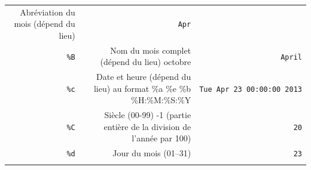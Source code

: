 \documentclass[12pt,]{book}
\numberwithin{equation}{section}
\numberwithin{countremarque}{section}
\begin{document}
\begin{longtable}[]{@{}rrr@{}}
\begin{minipage}[t]{0.60\columnwidth}
Abréviation du mois (dépend du lieu)\strut
\end{minipage} & \begin{minipage}[t]{0.22\columnwidth}\raggedleft\strut
\texttt{Apr}\strut
\end{minipage}\tabularnewline
\begin{minipage}[t]{0.10\columnwidth}\raggedleft\strut
\texttt{\%B}\strut
\end{minipage} & \begin{minipage}[t]{0.60\columnwidth}\raggedleft\strut
Nom du mois complet (dépend du lieu) octobre\strut
\end{minipage} & \begin{minipage}[t]{0.22\columnwidth}\raggedleft\strut
\texttt{April}\strut
\end{minipage}\tabularnewline
\begin{minipage}[t]{0.10\columnwidth}\raggedleft\strut
\texttt{\%c}\strut
\end{minipage} & \begin{minipage}[t]{0.60\columnwidth}\raggedleft\strut
Date et heure (dépend du lieu) au format \%a \%e \%b
\%H:\%M:\%S:\%Y\strut
\end{minipage} & \begin{minipage}[t]{0.22\columnwidth}\raggedleft\strut
\texttt{Tue\ Apr\ 23\ 00:00:00\ 2013}\strut
\end{minipage}\tabularnewline
\begin{minipage}[t]{0.10\columnwidth}\raggedleft\strut
\texttt{\%C}\strut
\end{minipage} & \begin{minipage}[t]{0.60\columnwidth}\raggedleft\strut
Siècle (00-99) -1 (partie entière de la division de l'année par
100)\strut
\end{minipage} & \begin{minipage}[t]{0.22\columnwidth}\raggedleft\strut
\texttt{20}\strut
\end{minipage}\tabularnewline
\begin{minipage}[t]{0.10\columnwidth}\raggedleft\strut
\texttt{\%d}\strut
\end{minipage} & \begin{minipage}[t]{0.60\columnwidth}\raggedleft\strut
Jour du mois (01--31)\strut
\end{minipage} & \begin{minipage}[t]{0.22\columnwidth}\raggedleft\strut
\texttt{23}\strut
\end{minipage}\tabularnewline
\begin{minipage}[t]{0.10\columnwidth}\raggedleft\strut

\end{minipage}
\end{longtable}
\end{document}
